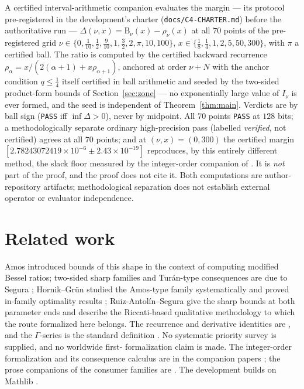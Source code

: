 \documentclass[11pt]{article}
\newcommand{\lean}[1]{\texttt{#1}}
\newcommand{\RHS}{\mathrm{B}}
\begin{document}
A certified interval-arithmetic companion evaluates the margin ---
its protocol pre-registered in the development's charter
(\lean{docs/C4-CHARTER.md}) before the authoritative run ---
$\Delta(\nu,x) = \RHS_\nu(x) - \rho_\nu(x)$ at all $70$ points of
the pre-registered grid
$\nu \in \{0, \tfrac1{10}, \tfrac12, \tfrac9{10}, 1, \tfrac32, 2,
\pi, 10, 100\}$,
$x \in \{\tfrac18, \tfrac14, 1, 2, 5, 50, 300\}$, with $\pi$ a
certified ball.  The ratio is computed by the certified backward
recurrence $\rho_\alpha = x/(2(\alpha+1) + x\rho_{\alpha+1})$,
anchored at order $\nu+N$ with the anchor condition
$q \le \tfrac14$ itself certified in ball arithmetic and seeded by
the two-sided product-form bounds of Section~\ref{sec:zone} --- no
exponentially large value of $I_\nu$ is ever formed, and the seed is
independent of Theorem~\ref{thm:main}.  Verdicts are by ball sign
(\lean{PASS} iff $\inf \Delta > 0$), never by midpoint.  All $70$
points \lean{PASS} at $128$ bits; a methodologically separate ordinary
high-precision pass (labelled \emph{verified}, not certified) agrees
at all $70$ points; and at $(\nu,x) = (0,300)$ the certified margin
$[2.78243072419\times10^{-6} \pm 2.43\times10^{-19}]$ reproduces,
by this entirely different method, the slack floor measured by the
integer-order companion of \cite{ErikssonC2}.  It is \emph{not}
part of the proof, and the proof does not cite it. Both computations
are author-repository artifacts; methodological separation does not
establish external operator or evaluator independence.

\section{Related work}\label{sec:related}

Amos \cite{Amos74} introduced bounds of this shape in the context of
computing modified Bessel ratios; two-sided sharp families and
Tur\'an-type consequences are due to Segura \cite{Segura11};
Hornik--Gr\"un studied the Amos-type family systematically
\cite{HG13} and proved in-family optimality results \cite{HG24};
Ruiz-Antol\'in--Segura \cite{RS16} give the sharp bounds at both
parameter ends and describe the Riccati-based qualitative
methodology to which the route formalized here belongs.  The
recurrence and derivative identities are \cite[10.29]{DLMF}, and the
$\Gamma$-series is the standard definition \cite[10.25.2]{DLMF}.  No systematic priority survey is supplied, and no worldwide first-
formalization claim is made. The integer-order formalization and its consequence calculus are in the companion
papers \cite{ErikssonC2,ErikssonC3}; the prose companions of the
consumer families are
\cite{ErikssonFH26,ErikssonVM26,ErikssonTuran26}.  The development
builds on Mathlib \cite{mathlib20}.
\end{document}
